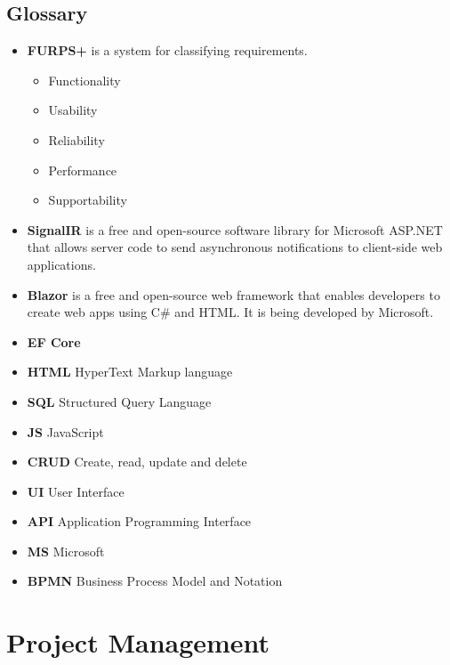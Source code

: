 \documentclass{scrartcl}
\begin{document}
\subsection{Glossary}
\begin{itemize}


\item \textbf{FURPS+}\cite{eeles2005capturing} is a system for classifying requirements.
\begin{itemize}
\item Functionality
\item Usability
\item Reliability
\item Performance
\item Supportability 
\end{itemize}


\item \textbf{ SignalIR} is a free and open-source software library for Microsoft ASP.NET that allows server code to send asynchronous notifications to client-side web applications. 

\item \textbf{Blazor} is a free and open-source web framework that enables developers to create web apps using C\# and HTML. It is being developed by Microsoft.

\item \textbf{EF Core} 

\item \textbf{HTML} HyperText Markup language


\item \textbf{SQL} Structured Query Language
\item \textbf{JS } JavaScript
\item \textbf{CRUD} Create, read, update and delete
\item \textbf{UI} User Interface
\item \textbf{API} Application Programming Interface 

\item \textbf{MS} Microsoft
\item \textbf{BPMN} Business Process Model and Notation



\end{itemize}

\section{Project Management}
\end{document}
